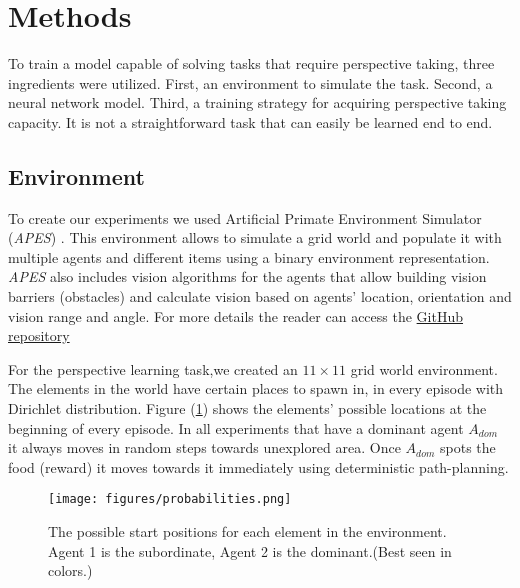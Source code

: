 \documentclass{article}
\begin{document}
\section{Methods}
To train a model capable of solving tasks that require perspective taking, three ingredients were utilized. First, an environment to simulate the task. Second, a neural network model. Third, a training strategy for acquiring perspective taking capacity. It is not a straightforward task that can easily be learned end to end.

\subsection{Environment}
To create our experiments we used Artificial Primate Environment Simulator (\textit{APES}) \cite{APES}. This environment allows to simulate a grid world and populate it with multiple agents and different items using a binary environment representation. \textit{APES} also includes vision algorithms for the agents that allow building vision barriers (obstacles) and calculate vision based on agents' location, orientation and vision range and angle. For more details the reader can access the \href{https://github.com/aqeel13932/APES}{GitHub repository}

For the perspective learning task,we created an $11\times11$ grid world environment. The elements in the world have certain places to spawn in, in every episode with Dirichlet distribution. Figure (\ref{fig:probabilities}) shows the elements' possible locations at the beginning of every episode. In all experiments that have a dominant agent \(A_{dom}\) it always moves in random steps towards unexplored area. Once \(A_{dom}\) spots the food (reward) it moves towards it immediately using deterministic path-planning.
\begin{figure}[H]
    \centering
    \texttt{[image: figures/probabilities.png]}
    \caption{The possible start positions for each element in the environment. Agent 1 is the subordinate, Agent 2 is the dominant.(Best seen in colors.)}
    \label{fig:probabilities}
\end{figure}
\end{document}

